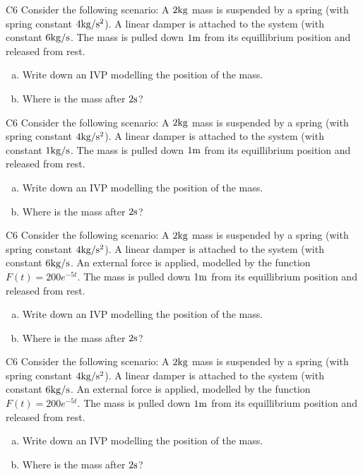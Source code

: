 \begin{problem}{C6}
Consider the following scenario:
A \(2 {\rm kg}\) mass is suspended by a spring (with spring constant \(4 {\rm kg /s^2}\)).  A linear damper is attached to the system (with constant \(6 {\rm kg/s}\).  The mass is pulled down \(1 {\rm m}\) from its equillibrium position and released from rest.  
\begin{enumerate}[(a)]
\item Write down an IVP modelling the position of the mass.
\item Where is the mass after \(2 {\rm s}\)?
\end{enumerate}
\end{problem}

\begin{problem}{C6}
Consider the following scenario:
A \(2 {\rm kg}\) mass is suspended by a spring (with spring constant \(4 {\rm kg /s^2}\)).  A linear damper is attached to the system (with constant \(1 {\rm kg/s}\).  The mass is pulled down \(1 {\rm m}\) from its equillibrium position and released from rest.  
\begin{enumerate}[(a)]
\item Write down an IVP modelling the position of the mass.
\item Where is the mass after \(2 {\rm s}\)?
\end{enumerate}
\end{problem}





\begin{problem}{C6}
Consider the following scenario:
A \(2 {\rm kg}\) mass is suspended by a spring (with spring constant \(4 {\rm kg /s^2}\)).  A linear damper is attached to the system (with constant \(6 {\rm kg/s}\).  An external force is applied, modelled by the function \(F(t)=200e^{-5t}\).  The mass is pulled down \(1 {\rm m}\) from its equillibrium position and released from rest.  
\begin{enumerate}[(a)]
\item Write down an IVP modelling the position of the mass.
\item Where is the mass after \(2 {\rm s}\)?
\end{enumerate}
\end{problem}

\begin{problem}{C6}
Consider the following scenario:
A \(2 {\rm kg}\) mass is suspended by a spring (with spring constant \(4 {\rm kg /s^2}\)).  A linear damper is attached to the system (with constant \(6 {\rm kg/s}\).  An external force is applied, modelled by the function \(F(t)=200e^{-5t}\).  The mass is pulled down \(1 {\rm m}\) from its equillibrium position and released from rest.  
\begin{enumerate}[(a)]
\item Write down an IVP modelling the position of the mass.
\item Where is the mass after \(2 {\rm s}\)?
\end{enumerate}
\end{problem}
